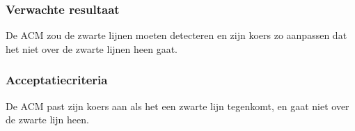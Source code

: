 \subsubsection{Verwachte resultaat}

\begin{flushleft}
    De ACM zou de zwarte lijnen moeten detecteren en zijn koers zo aanpassen dat het niet over de zwarte lijnen heen gaat.
\end{flushleft}

\subsubsection{Acceptatiecriteria}

\begin{flushleft}
    De ACM past zijn koers aan als het een zwarte lijn tegenkomt, en gaat niet over de zwarte lijn heen.
\end{flushleft}